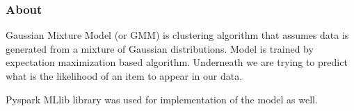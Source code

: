 \subsubsection{About}

Gaussian Mixture Model (or GMM) is clustering algorithm \parencite{reynolds2009gaussian} that assumes data is generated from a mixture of Gaussian distributions. Model is trained by expectation maximization based algorithm. Underneath we are trying to predict what is the likelihood of an item to appear in our data.

Pyspark MLlib library was used for implementation of the model as well.